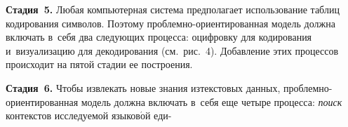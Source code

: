 \begin{multicols}{2}
  \textbf{Стадия~5.} Любая компьютерная сис\-те\-ма предполагает 
использование таб\-лиц кодирования символов. Поэтому проблемно-ори\-ен\-ти\-ро\-ван\-ная 
модель долж\-на включать в~себя два сле\-ду\-ющих процесса: 
оциф\-ров\-ку для кодирования и~визуализацию для декодирования (см.\ рис.~4). 
До\-бав\-ле\-ние этих процессов происходит на пятой стадии ее по\-стро\-ения.
  
\smallskip

  \textbf{Стадия~6.} Чтобы извлекать новые знания из\linebreak текс\-то\-вых данных,  
проб\-лем\-но-ори\-ен\-ти\-ро\-ван\-ная модель должна включать в~себя еще 
четыре процесса: \textit{поиск} кон\-текс\-тов ис\-сле\-ду\-емой 
язы\-ко\-в$\acute{\mbox{о}}$й еди-\linebreak\vspace*{-12pt}

\pagebreak

\end{multicols}

\begin{figure*} %
 \vspace*{1pt}
  \begin{center}
 \mbox{%
 \epsfxsize=152.859mm 
 }
\end{center}
\vspace*{-9pt}
  \vspace*{-3pt}
\end{figure*}

